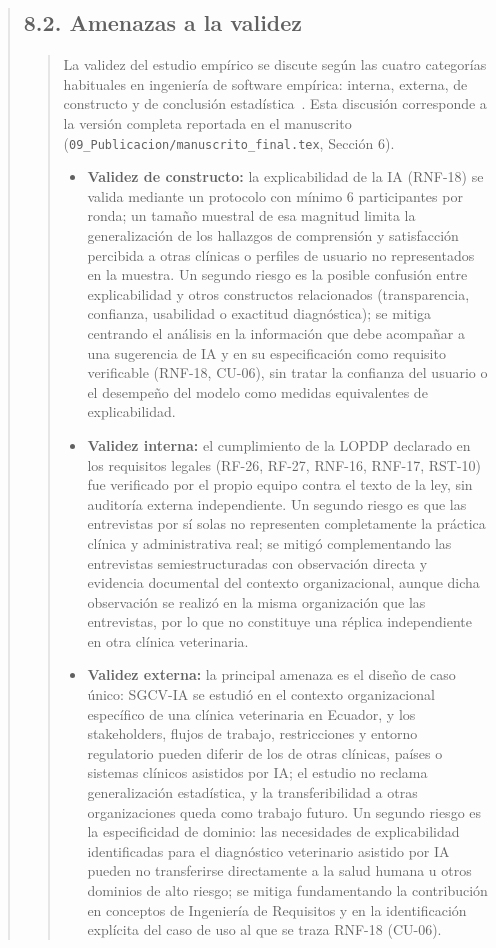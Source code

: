 \documentclass[
]{article}
\begin{document}
\begin{quote}
\subsection{8.2. Amenazas a la validez}\label{s7-4-amenazas-a-la-validez}
\begin{quote}
La validez del estudio empírico se discute según las cuatro categorías
habituales en ingeniería de software empírica: interna, externa, de
constructo y de conclusión estadística~\cite{wohlin2012}. Esta
discusión corresponde a la versión completa reportada en el manuscrito
(\texttt{09\_Publicacion/manuscrito\_final.tex}, Sección 6).
\begin{itemize}
  \item \textbf{Validez de constructo:} la explicabilidad de la IA
  (RNF-18) se valida mediante un protocolo con mínimo 6 participantes
  por ronda; un tamaño muestral de esa magnitud limita la
  generalización de los hallazgos de comprensión y satisfacción
  percibida a otras clínicas o perfiles de usuario no representados en
  la muestra. Un segundo riesgo es la posible confusión entre
  explicabilidad y otros constructos relacionados (transparencia,
  confianza, usabilidad o exactitud diagnóstica); se mitiga centrando
  el análisis en la información que debe acompañar a una sugerencia de
  IA y en su especificación como requisito verificable (RNF-18,
  CU-06), sin tratar la confianza del usuario o el desempeño del
  modelo como medidas equivalentes de explicabilidad.
  \item \textbf{Validez interna:} el cumplimiento de la LOPDP declarado
  en los requisitos legales (RF-26, RF-27, RNF-16, RNF-17, RST-10) fue
  verificado por el propio equipo contra el texto de la ley, sin
  auditoría externa independiente. Un segundo riesgo es que las
  entrevistas por sí solas no representen completamente la práctica
  clínica y administrativa real; se mitigó complementando las
  entrevistas semiestructuradas con observación directa y evidencia
  documental del contexto organizacional, aunque dicha observación se
  realizó en la misma organización que las entrevistas, por lo que no
  constituye una réplica independiente en otra clínica veterinaria.
  \item \textbf{Validez externa:} la principal amenaza es el diseño de
  caso único: SGCV-IA se estudió en el contexto organizacional
  específico de una clínica veterinaria en Ecuador, y los stakeholders,
  flujos de trabajo, restricciones y entorno regulatorio pueden diferir
  de los de otras clínicas, países o sistemas clínicos asistidos por
  IA; el estudio no reclama generalización estadística, y la
  transferibilidad a otras organizaciones queda como trabajo futuro. Un
  segundo riesgo es la especificidad de dominio: las necesidades de
  explicabilidad identificadas para el diagnóstico veterinario asistido
  por IA pueden no transferirse directamente a la salud humana u otros
  dominios de alto riesgo; se mitiga fundamentando la contribución en
  conceptos de Ingeniería de Requisitos y en la identificación explícita
  del caso de uso al que se traza RNF-18 (CU-06).


\end{itemize}
\end{quote}
\end{quote}
\end{document}
